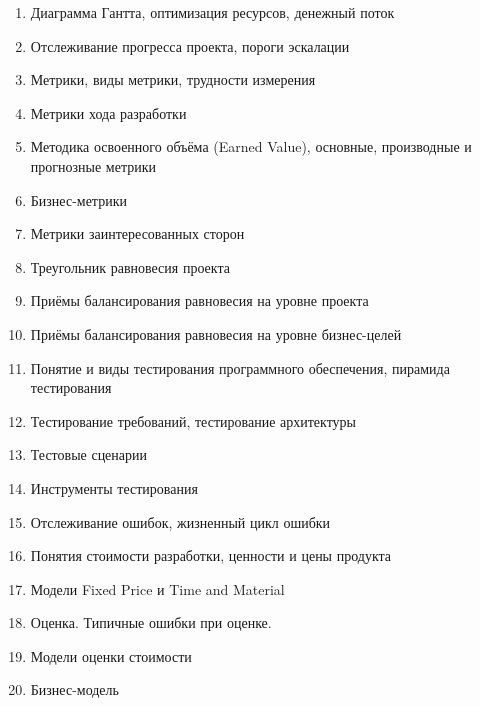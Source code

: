 \documentclass[a5paper]{article}
\begin{document}
\begin{enumerate}
    \item Диаграмма Гантта, оптимизация ресурсов, денежный поток
    \item Отслеживание прогресса проекта, пороги эскалации
    \item Метрики, виды метрики, трудности измерения
    \item Метрики хода разработки
    \item Методика освоенного объёма (Earned Value), основные, производные и прогнозные метрики
    \item Бизнес-метрики
    \item Метрики заинтересованных сторон
    \item Треугольник равновесия проекта
    \item Приёмы балансирования равновесия на уровне проекта
    \item Приёмы балансирования равновесия на уровне бизнес-целей
    \item Понятие и виды тестирования программного обеспечения, пирамида тестирования
    \item Тестирование требований, тестирование архитектуры
    \item Тестовые сценарии
    \item Инструменты тестирования
    \item Отслеживание ошибок, жизненный цикл ошибки
    \item Понятия стоимости разработки, ценности и цены продукта
    \item Модели Fixed Price и Time and Material
    \item Оценка. Типичные ошибки при оценке.
    \item Модели оценки стоимости
    \item Бизнес-модель
\end{enumerate}
\end{document}
